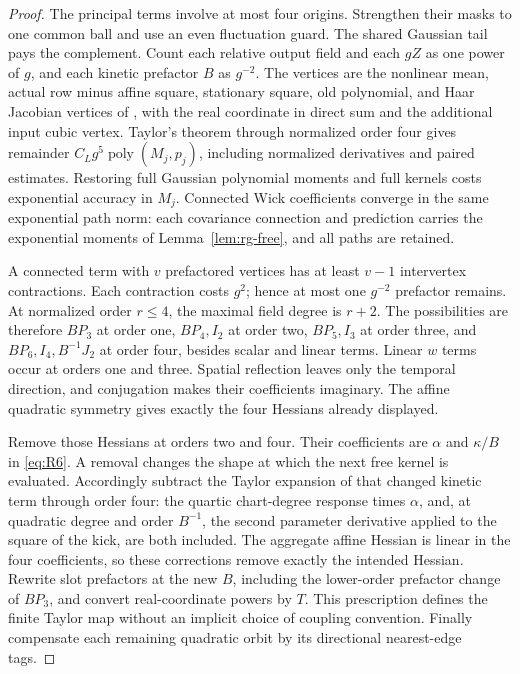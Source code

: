 \begin{proof}
The principal terms involve at most four origins.  Strengthen their
masks to one common ball and use an even fluctuation guard.  The shared
Gaussian tail pays the complement.  Count each relative output field
and each $gZ$ as one power of $g$, and each kinetic prefactor $B$ as
$g^{-2}$.  The vertices are the nonlinear mean, actual row minus affine
square, stationary square, old polynomial, and Haar Jacobian vertices
of \cite[Section ``The canonical coefficients'']{SharpO4}, with the
real coordinate in direct sum and the additional input cubic vertex.
Taylor's theorem through normalized order four gives remainder
$C_Lg^5\operatorname{poly}(M_j,p_j)$, including normalized derivatives
and paired estimates.  Restoring full Gaussian polynomial moments and
full kernels costs exponential accuracy in $M_j$.  Connected Wick
coefficients converge in the same exponential path norm: each covariance
connection and prediction carries the exponential moments of
Lemma~\ref{lem:rg-free}, and all paths are retained.

A connected term with $v$ prefactored vertices has at least $v-1$
intervertex contractions.  Each contraction costs $g^2$; hence at most
one $g^{-2}$ prefactor remains.  At normalized order $r\le4$, the
maximal field degree is $r+2$.  The possibilities are therefore
$BP_3$ at order one, $BP_4,I_2$ at order two, $BP_5,I_3$ at order
three, and $BP_6,I_4,B^{-1}J_2$ at order four, besides scalar and linear
terms.  Linear $w$ terms occur at orders one and three.  Spatial
reflection leaves only the temporal direction, and conjugation makes
their coefficients imaginary.  The affine quadratic symmetry gives
exactly the four Hessians already displayed.

Remove those Hessians at orders two and four.  Their coefficients are
$\alpha$ and $\kappa/B$ in \eqref{eq:R6}.  A removal changes the shape
at which the next free kernel is evaluated.  Accordingly subtract the
Taylor expansion of that changed kinetic term through order four: the
quartic chart-degree response times $\alpha$, and, at quadratic degree
and order $B^{-1}$, the second parameter derivative applied to the
square of the kick, are both included.  The aggregate affine Hessian
is linear in the four coefficients, so these corrections remove exactly
the intended Hessian.  Rewrite slot prefactors at the new $B$, including
the lower-order prefactor change of $BP_3$, and convert real-coordinate
powers by $T$.  This prescription defines the finite Taylor map without
an implicit choice of coupling convention.  Finally compensate each
remaining quadratic orbit by its directional nearest-edge tags.


\end{proof}
